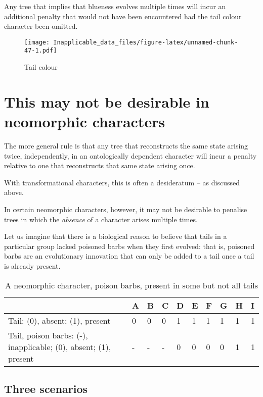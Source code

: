 \documentclass[]{book}
\theoremstyle{definition}
\theoremstyle{definition}
\theoremstyle{definition}
\theoremstyle{remark}
\begin{document}
Any tree that implies that blueness evolves multiple times will incur an
additional penalty that would not have been encountered had the tail
colour character been omitted.

\begin{figure}
\centering
\texttt{[image: Inapplicable\_data\_files/figure-latex/unnamed-chunk-47-1.pdf]}
\caption{\label{fig:unnamed-chunk-47}Tail colour}
\end{figure}

\section{This may not be desirable in neomorphic
characters}\label{this-may-not-be-desirable-in-neomorphic-characters}

The more general rule is that any tree that reconstructs the same state
arising twice, independently, in an ontologically dependent character
will incur a penalty relative to one that reconstructs that same state
arising once.

With transformational characters, this is often a desideratum -- as
discussed above.

In certain neomorphic characters, however, it may not be desirable to
penalise trees in which the \emph{absence} of a character arises
multiple times.

Let us imagine that there is a biological reason to believe that tails
in a particular group lacked poisoned barbs when they first evolved:
that is, poisoned barbs are an evolutionary innovation that can only be
added to a tail once a tail is already present.

\begin{table}

\caption{\label{tab:unnamed-chunk-48}A neomorphic character, poison barbs, present in some but not all tails}
\centering
\begin{tabular}[t]{l|l|l|l|l|l|l|l|l|l}
\hline
  & A & B & C & D & E & F & G & H & I\\
\hline
Tail: (0), absent; (1), present & 0 & 0 & 0 & 1 & 1 & 1 & 1 & 1 & 1\\
\hline
Tail, poison barbs: (-), inapplicable; (0), absent; (1), present & - & - & - & 0 & 0 & 0 & 0 & 1 & 1\\
\hline
\end{tabular}
\end{table}

\subsection{Three scenarios}\label{three-scenarios}
\end{document}
